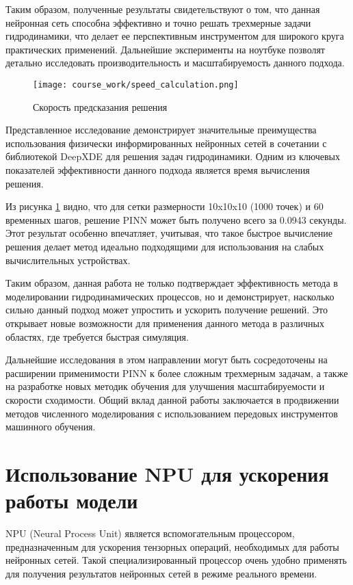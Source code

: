 Таким образом, полученные результаты свидетельствуют о том, что данная нейронная сеть способна
эффективно и точно решать трехмерные задачи гидродинамики, что делает ее перспективным инструментом для широкого круга
практических применений. Дальнейшие эксперименты на ноутбуке позволят детально исследовать производительность и масштабируемость данного подхода.

\begin{figure}[h]
    \center
    \texttt{[image: course\_work/speed\_calculation.png]}
    \caption{Скорость предсказания решения}
    \label{fig:speed}
\end{figure}
Представленное исследование демонстрирует значительные преимущества использования физически информированных нейронных сетей 
в сочетании с библиотекой DeepXDE для решения задач гидродинамики. Одним из ключевых показателей эффективности данного 
подхода является время вычисления решения.

Из рисунка \ref{fig:speed} видно, что для сетки размерности 10x10x10 (1000 точек) и 60 временных шагов, решение PINN может быть
получено всего за 0.0943 секунды. Этот результат особенно впечатляет, учитывая, что такое быстрое вычисление решения делает метод
идеально подходящими для использования на слабых вычислительных устройствах.

Таким образом, данная работа не только подтверждает эффективность метода в моделировании гидродинамических процессов,
но и демонстрирует, насколько сильно данный подход может упростить и ускорить получение решений. Это открывает новые возможности
для применения данного метода в различных областях, где требуется быстрая симуляция.

Дальнейшие исследования в этом направлении могут быть сосредоточены на расширении применимости PINN к более сложным трехмерным задачам,
а также на разработке новых методик обучения для улучшения масштабируемости и скорости сходимости. Общий вклад данной работы
заключается в продвижении методов численного моделирования с использованием передовых инструментов машинного обучения.
\chapter{Использование NPU для ускорения работы модели}
NPU (Neural Process Unit) является вспомогательным процессором, предназначенным для ускорения тензорных операций, 
необходимых для работы нейронных сетей. Такой специализированный процессор очень удобно применять для получения результатов 
нейронных сетей в режиме реального времени.

